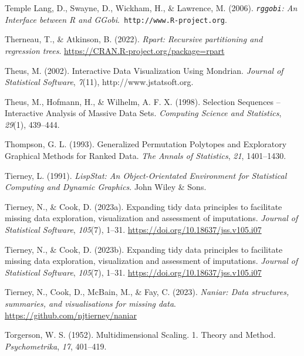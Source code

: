 \documentclass[
  letterpaper,
]{krantz}
\newlength{\cslhangindent}
\newlength{\cslentryspacingunit} %
\newenvironment{CSLReferences}[2] %
 {%
  \setlength{\parindent}{0pt}
  \ifodd #1
  \let\oldpar\par
  \def\par{\hangindent=\cslhangindent\oldpar}
  \fi
  \setlength{\parskip}{#2\cslentryspacingunit}
 }%
 {}
\begin{document}
\begin{CSLReferences}{1}{0}
\leavevmode{}%
Temple Lang, D., Swayne, D., Wickham, H., \& Lawrence, M. (2006).
\emph{{\texttt{rggobi}}: {A}n {I}nterface between {R} and
{GG}obi}.{\texttt{\ http://www.R-project.org}}.

\leavevmode{}%
Therneau, T., \& Atkinson, B. (2022). \emph{Rpart: Recursive
partitioning and regression trees}.
\url{https://CRAN.R-project.org/package=rpart}

\leavevmode{}%
Theus, M. (2002). Interactive {D}ata {V}isualization {U}sing {M}ondrian.
\emph{Journal of Statistical Software}, \emph{7}(11),
http://www.jstatsoft.org.

\leavevmode{}%
Theus, M., Hofmann, H., \& Wilhelm, A. F. X. (1998). Selection
{S}equences -- {I}nteractive {A}nalysis of {M}assive {D}ata {S}ets.
\emph{Computing Science and Statistics}, \emph{29}(1), 439--444.

\leavevmode{}%
Thompson, G. L. (1993). Generalized {P}ermutation {P}olytopes and
{E}xploratory {G}raphical {M}ethods for {R}anked {D}ata. \emph{The
Annals of Statistics}, \emph{21}, 1401--1430.

\leavevmode{}%
Tierney, L. (1991). \emph{{L}isp{S}tat: {A}n {O}bject-{O}rientated
{E}nvironment for {S}tatistical {C}omputing and {D}ynamic {G}raphics}.
John Wiley \& Sons.

\leavevmode{}%
Tierney, N., \& Cook, D. (2023a). Expanding tidy data principles to
facilitate missing data exploration, visualization and assessment of
imputations. \emph{Journal of Statistical Software}, \emph{105}(7),
1--31. \url{https://doi.org/10.18637/jss.v105.i07}

\leavevmode{}%
Tierney, N., \& Cook, D. (2023b). Expanding tidy data principles to
facilitate missing data exploration, visualization and assessment of
imputations. \emph{Journal of Statistical Software}, \emph{105}(7),
1--31. \url{https://doi.org/10.18637/jss.v105.i07}

\leavevmode{}%
Tierney, N., Cook, D., McBain, M., \& Fay, C. (2023). \emph{Naniar: Data
structures, summaries, and visualisations for missing data}.
\url{https://github.com/njtierney/naniar}

\leavevmode{}%
Torgerson, W. S. (1952). Multidimensional {S}caling. 1. {T}heory and
{M}ethod. \emph{Psychometrika}, \emph{17}, 401--419.


\end{CSLReferences}
\end{document}
